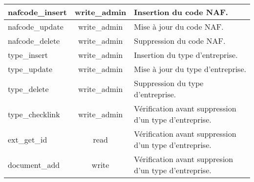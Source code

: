 \begin{tabular}{|l|c|p{9.5cm}|}
 \hline
  nafcode\_insert & write\_admin & Insertion du code NAF. \\
 \hline
  nafcode\_update & write\_admin & Mise à jour du code NAF. \\
 \hline
  nafcode\_delete & write\_admin & Suppression du code NAF. \\
 \hline
  type\_insert & write\_admin & Insertion du type d'entreprise. \\
 \hline
  type\_update & write\_admin & Mise à jour du type d'entreprise. \\
 \hline
  type\_delete & write\_admin & Suppression du type d'entreprise. \\
 \hline
  type\_checklink & write\_admin & Vérification avant suppression d'un type d'entreprise. \\
 \hline
  ext\_get\_id & read & Vérification avant suppression d'un type d'entreprise. \\
 \hline
  document\_add & write & Vérification avant suppresion d'un type d'entreprise. \\
 \hline
\end{tabular}
